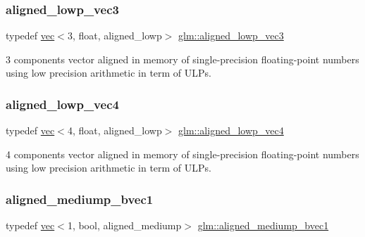 \subsubsection{\texorpdfstring{aligned\+\_\+lowp\+\_\+vec3}{aligned\_lowp\_vec3}}
{\footnotesize\ttfamily typedef \hyperlink{structglm_1_1vec}{vec}$<$3, float, aligned\+\_\+lowp$>$ \hyperlink{group__gtc__type__aligned_ga74eb3cf8a9ff6234da5d26f9203e179d}{glm\+::aligned\+\_\+lowp\+\_\+vec3}}



3 components vector aligned in memory of single-\/precision floating-\/point numbers using low precision arithmetic in term of U\+L\+Ps. 

\mbox{\label{group__gtc__type__aligned_gaba45497051d04e2aa681653c14fc023c}} 
\subsubsection{\texorpdfstring{aligned\+\_\+lowp\+\_\+vec4}{aligned\_lowp\_vec4}}
{\footnotesize\ttfamily typedef \hyperlink{structglm_1_1vec}{vec}$<$4, float, aligned\+\_\+lowp$>$ \hyperlink{group__gtc__type__aligned_gaba45497051d04e2aa681653c14fc023c}{glm\+::aligned\+\_\+lowp\+\_\+vec4}}



4 components vector aligned in memory of single-\/precision floating-\/point numbers using low precision arithmetic in term of U\+L\+Ps. 

\mbox{\label{group__gtc__type__aligned_gad5720386d2fb75c295f49312284abd13}} 
\subsubsection{\texorpdfstring{aligned\+\_\+mediump\+\_\+bvec1}{aligned\_mediump\_bvec1}}
{\footnotesize\ttfamily typedef \hyperlink{structglm_1_1vec}{vec}$<$1, bool, aligned\+\_\+mediump$>$ \hyperlink{group__gtc__type__aligned_gad5720386d2fb75c295f49312284abd13}{glm\+::aligned\+\_\+mediump\+\_\+bvec1}}



